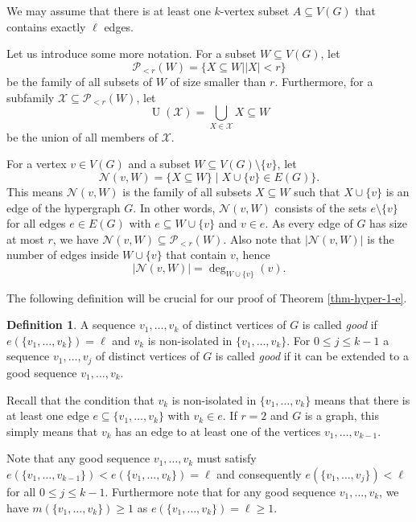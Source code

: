 \documentclass[11pt]{article}
\theoremstyle{definition}
\newtheorem{definition}[theorem]{Definition}
\numberwithin{equation}{section}
\begin{document}
We may assume that there is at least one $k$-vertex subset $A\subseteq V(G)$ that contains exactly $\ell$ edges.

Let us introduce some more notation. For a subset $W\subseteq V(G)$, let
\[\mathcal{P}\!_{<r}(W)=\lbrace X\subseteq W\mid \vert X\vert<r\rbrace\]
be the family of all subsets of $W$ of size smaller than $r$. Furthermore, for a subfamily $\mathcal{X}\subseteq \mathcal{P}\!_{<r}(W)$, let
\[\operatorname{U}(\mathcal{X})=\bigcup_{X\in \mathcal{X}}X\subseteq W\]
be the union of all members of $\mathcal{X}$.

For a vertex $v\in V(G)$ and a subset $W\subseteq V(G)\setminus \lbrace v\rbrace$, let
\[\mathcal{N}(v,W)=\lbrace X \subseteq W\rbrace\mid X\cup \lbrace v\rbrace\in E(G)\rbrace.\]
This means $\mathcal{N}(v,W)$ is the family of all subsets $X\subseteq W$ such that $X\cup \lbrace v\rbrace$ is an edge of the hypergraph $G$. In other words, $\mathcal{N}(v,W)$ consists of the sets $e\setminus \lbrace v\rbrace$ for all edges $e\in E(G)$ with $e\subseteq W\cup \lbrace v\rbrace$ and $v\in e$. As every edge of $G$ has size at most $r$, we have $\mathcal{N}(v,W)\subseteq \mathcal{P}\!_{<r}(W)$. Also note that $\vert \mathcal{N}(v,W)\vert$ is the number of edges inside $W\cup \lbrace v\rbrace$ that contain $v$, hence
\[\vert \mathcal{N}(v,W)\vert=\deg_{W\cup \lbrace v\rbrace}(v).\]

The following definition will be crucial for our proof of Theorem \ref{thm-hyper-1-e}.

\begin{definition}A sequence $v_1,\dots,v_k$ of distinct vertices of $G$ is called \emph{good} if $e(\lbrace v_1,\dots,v_k\rbrace)=\ell$ and $v_k$ is non-isolated in $\lbrace v_1,\dots,v_k\rbrace$. For $0\leq j\leq k-1$ a sequence $v_1,\dots,v_j$ of distinct vertices of $G$ is called \emph{good} if it can be extended to a good sequence $v_1,\dots,v_k$.
\end{definition}

Recall that the condition that $v_k$ is non-isolated in $\lbrace v_1,\dots,v_k\rbrace$ means that there is at least one edge $e\subseteq \lbrace v_1,\dots,v_k\rbrace$ with $v_k\in e$. If $r=2$ and $G$ is a graph, this simply means that $v_k$ has an edge to at least one of the vertices $v_1,\dots,v_{k-1}$.

Note that any good sequence $v_1,\dots,v_k$ must satisfy $e(\lbrace v_1,\dots,v_{k-1}\rbrace)<e(\lbrace v_1,\dots,v_{k}\rbrace)=\ell$ and consequently $e(\lbrace v_1,\dots,v_j\rbrace)<\ell$ for all $0\leq j\leq k-1$. Furthermore note that for any good sequence $v_1,\dots,v_k$, we have $m(\lbrace v_1,\dots,v_k\rbrace)\geq 1$ as $e(\lbrace v_1,\dots,v_k\rbrace)=\ell\geq 1$.
\end{document}
